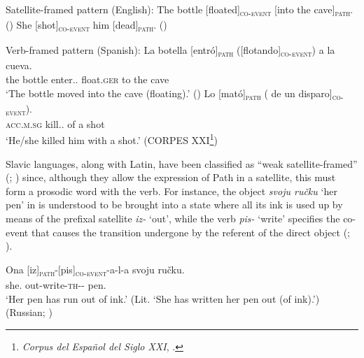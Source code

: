 \documentclass[output=paper,colorlinks,citecolor=brown]{langscibook}
\begin{document}
\largerpage

\ea Satellite-framed pattern (English): \label{sfen} \ea \label{sfeninto} The bottle [floated]\textsubscript{\textsc{co-event}} [into the cave]\textsubscript{\textsc{path}}. \hfill (\citealt[227]{Talmy2000})
\ex She [shot]\textsubscript{\textsc{co-event}} him [dead]\textsubscript{\textsc{path}}. \hfill (\citealt[136]{Goldberg1995}) \z \z

\ea Verb-framed pattern (Spanish): \label{vfsp} \ea \gll La botella  [entró]\textsubscript{\textsc{path}} ([flotando]\textsubscript{\textsc{co-event}}) a la cueva.\\
the bottle enter.{\PST.\AGR} \hspace{3pt}float.\textsc{ger} to the cave \\
\glt `The bottle moved into the cave (floating).' \hfill (\citealt[227]{Talmy2000})
\ex \gll Lo [mató]\textsubscript{\textsc{path}} (\minsp{[} de un disparo]\textsubscript{\textsc{co-event}}).\\
\textsc{acc.m.sg} kill.{\PST.\AGR} {} of a shot\\\glt `He/she killed him with a shot.’ \hfill (CORPES XXI\footnote{\textit{Corpus del Español del Siglo XXI}, \citet{RAECorpes}.})
\z \z

\noindent Slavic languages, along with Latin, have been classified as ``weak satellite-framed'' (\citealt{Acedo-Matellan2010}; \citeyear{Acedo-Matellan2016}) since, although they allow the expression of Path in a satellite, this must form a prosodic word with the verb. For instance, the object \textit{svoju ručku} `her pen' in  is understood to be brought into a state where all its ink is used up by means of the prefixal satellite \textit{iz-} `out', while the verb \textit{pis-} `write' specifies the co-event that causes the transition undergone by the referent of the direct object (\citealt{Spencerandzaretskaya1998}; \citealt{Mateu2008}).

\ea \gll Ona [iz]\textsubscript{\textsc{path}}-[pis]\textsubscript{\textsc{co-event}}-a-l-a svoju ručku.\\
she.{\NOM} out-write-\textsc{th}-{\PST-\AGR} {\POSS} pen.{\ACC}\\
\glt `Her pen has run out of ink.' (Lit. `She has written her pen out (of ink).') \label{ispisala}
\hfill (Russian; \citealt[17]{Spencerandzaretskaya1998}) \z
\end{document}
